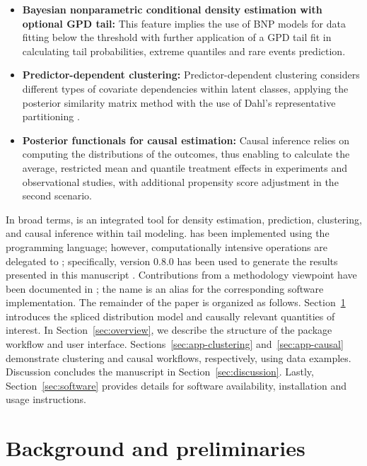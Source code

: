 \documentclass[article]{jss}\usepackage[]{graphicx}\usepackage[]{xcolor}
\begin{document}
\begin{itemize}
  \item[(i)] \textbf{Bayesian nonparametric conditional density estimation with optional GPD tail:} This feature implies the use of BNP models for data fitting below the threshold with further application of a GPD tail fit in calculating tail probabilities, extreme quantiles and rare events prediction.

  \item[(ii)] \textbf{Predictor-dependent clustering:} Predictor-dependent clustering considers different types of covariate dependencies within latent classes, applying the posterior similarity matrix method with the use of Dahl's representative partitioning \citep{Binder1978,Dahl2006}.

  \item[(iii)] \textbf{Posterior functionals for causal estimation:} Causal inference relies on computing the distributions of the outcomes, thus enabling to calculate the average, restricted mean and quantile treatment effects in experiments and observational studies, with additional propensity score adjustment in the second scenario.
\end{itemize}

In broad terms,  is an integrated tool for density
estimation, prediction, clustering, and causal inference within tail modeling.
 has been implemented using the  programming
language; however, computationally intensive operations are delegated to
 \citep{nimble_method,nimble_pkg}; specifically,  version
0.8.0 has been used to generate the results presented
in this manuscript \citep{CausalMixGPD_pkg}.
Contributions from a methodology viewpoint have been documented in
\citet{Aich2026ExtremeCQTE}; the name  is an alias for
the corresponding software implementation.
The remainder of the paper is organized as follows.
Section~\ref{sec:prelim} introduces the spliced distribution model
and causally relevant quantities of interest.
In Section~\ref{sec:overview}, we describe the structure of the package
workflow and user interface.
Sections~\ref{sec:app-clustering} and~\ref{sec:app-causal} demonstrate
clustering and causal workflows, respectively, using data examples.
Discussion concludes the manuscript in Section~\ref{sec:discussion}.
Lastly, Section~\ref{sec:software}  provides details for
software availability, installation and usage instructions.

\section{Background and preliminaries}
\label{sec:prelim}
\end{document}
